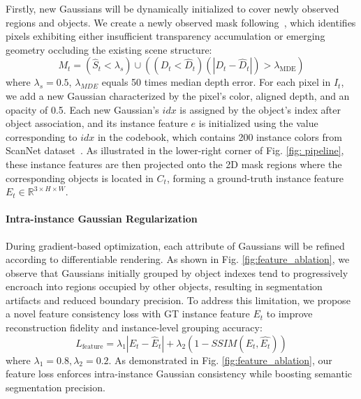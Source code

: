 Firstly, new Gaussians will be dynamically initialized to cover newly observed regions and objects. We create a newly observed mask following~\cite{keetha2024splatam}, which identifies pixels exhibiting either insufficient transparency accumulation or emerging geometry occluding the existing scene structure: 
\begin{equation}
M_t = (\hat{S}_t < \lambda_s) \cup  ((D_t < \hat{D}_t) (|D_t - \hat{D}_t|) > \lambda_\text{MDE} )
\end{equation}
where $\lambda_s = 0.5$, $\lambda_{MDE}$ equals 50 times median depth error. For each pixel in $I_t$, we add a new Gaussian characterized by the pixel's color, aligned depth, and an opacity of 0.5. Each new Gaussian's $idx$ is assigned by the object's index after object association, and its instance feature $e$ is initialized using the value corresponding to $idx$ in the codebook, which contains 200 instance colors from ScanNet dataset~\cite{dai2017scannet}. As illustrated in the lower-right corner of Fig. \ref{fig: pipeline},
these instance features are then projected onto the 2D mask regions where the corresponding objects is located in $C_{t}$, forming a ground-truth instance feature $E_t  \in \mathbb{R}^{3\times H\times W}$.

\paragraph{Intra-instance Gaussian Regularization}
\label{para:regularization}

During gradient-based optimization, each attribute of Gaussians will be refined according to differentiable rendering. As shown in Fig. \ref{fig:feature_ablation},
we observe that Gaussians initially grouped by object indexes tend to progressively encroach into regions occupied by other objects, resulting in segmentation artifacts and reduced boundary precision. To address this limitation, we propose a novel feature consistency loss with GT instance feature $E_t$ to improve reconstruction fidelity and instance-level grouping accuracy:
\begin{equation}
L_\text{feature} = \lambda_1|E_t - \hat{E}_t| + \lambda_2(1-SSIM(E_t, \hat{E_t}))
\end{equation}
where $\lambda_1 = 0.8, \lambda_2 = 0.2$. As demonstrated in Fig. \ref{fig:feature_ablation}, our feature loss enforces intra-instance Gaussian consistency while boosting semantic segmentation precision.

